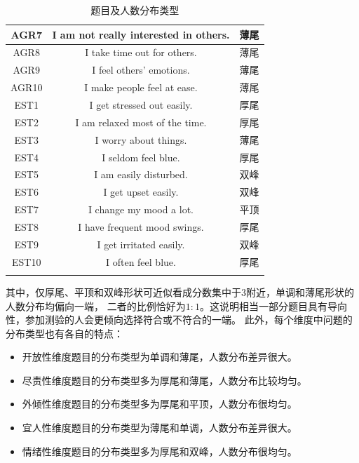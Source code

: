 \documentclass[UTF8]{ctexart}
\begin{document}
\begin{longtable}{c|c|c}
  AGR7         & I am not really interested in others.                    & 薄尾            \\\hline
  AGR8         & I take time out for others.                              & 薄尾            \\\hline
  AGR9         & I feel others' emotions.                                 & 薄尾            \\\hline
  AGR10        & I make people feel at ease.                              & 薄尾            \\\hline
  EST1         & I get stressed out easily.                               & 厚尾            \\\hline
  EST2         & I am relaxed most of the time.                           & 厚尾            \\\hline
  EST3         & I worry about things.                                    & 薄尾            \\\hline
  EST4         & I seldom feel blue.                                      & 厚尾            \\\hline
  EST5         & I am easily disturbed.                                   & 双峰            \\\hline
  EST6         & I get upset easily.                                      & 双峰            \\\hline
  EST7         & I change my mood a lot.                                  & 平顶            \\\hline
  EST8         & I have frequent mood swings.                             & 厚尾            \\\hline
  EST9         & I get irritated easily.                                  & 双峰            \\\hline
  EST10        & I often feel blue.                                       & 厚尾            \\\hline
  \caption{题目及人数分布类型}
  \label{type}
\end{longtable}\par
其中，仅厚尾、平顶和双峰形状可近似看成分数集中于3附近，单调和薄尾形状的人数分布均偏向一端，
二者的比例恰好为$1:1$。这说明相当一部分题目具有导向性，参加测验的人会更倾向选择符合或不符合的一端。
此外，每个维度中问题的分布类型也有各自的特点：
\begin{itemize}
  \item 开放性维度题目的分布类型为单调和薄尾，人数分布差异很大。
  \item 尽责性维度题目的分布类型多为厚尾和薄尾，人数分布比较均匀。
  \item 外倾性维度题目的分布类型多为厚尾和平顶，人数分布很均匀。
  \item 宜人性维度题目的分布类型为薄尾和单调，人数分布差异很大。
  \item 情绪性维度题目的分布类型多为厚尾和双峰，人数分布很均匀。
\end{itemize}
\end{document}
